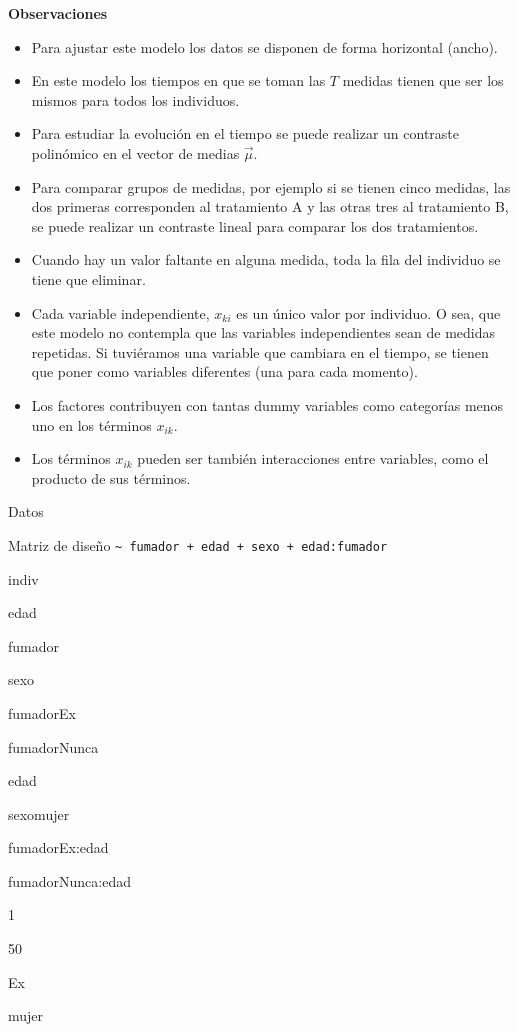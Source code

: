 \documentclass[
]{book}
\begin{document}
\textbf{Observaciones}

\begin{itemize}
\item
  Para ajustar este modelo los datos se disponen de forma horizontal (ancho).
\item
  En este modelo los tiempos en que se toman las \(T\) medidas tienen que ser los mismos para todos los individuos.
\item
  Para estudiar la evolución en el tiempo se puede realizar un contraste polinómico en el vector de medias \(\vec{\mu}\).
\item
  Para comparar grupos de medidas, por ejemplo si se tienen cinco medidas, las dos primeras corresponden al tratamiento A y las otras tres al tratamiento B, se puede realizar un contraste lineal para comparar los dos tratamientos.
\item
  Cuando hay un valor faltante en alguna medida, toda la fila del individuo se tiene que eliminar.
\item
  Cada variable independiente, \(x_{ki}\) es un único valor por individuo. O sea, que este modelo no contempla que las variables independientes sean de medidas repetidas. Si tuviéramos una variable que cambiara en el tiempo, se tienen que poner como variables diferentes (una para cada momento).
\item
  Los factores contribuyen con tantas dummy variables como categorías menos uno en los términos \(x_{ik}\).
\item
  Los términos \(x_{ik}\) pueden ser también interacciones entre variables, como el producto de sus términos.
\end{itemize}

Datos

Matriz de diseño \texttt{\textasciitilde{}\ fumador\ +\ edad\ +\ sexo\ +\ edad:fumador}

indiv

edad

fumador

sexo

fumadorEx

fumadorNunca

edad

sexomujer

fumadorEx:edad

fumadorNunca:edad

1

50

Ex

mujer
\end{document}
